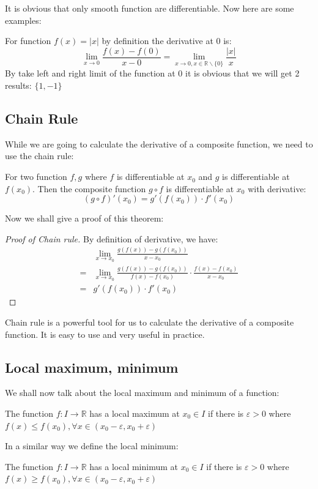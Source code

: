 \documentclass{article}
\newcommand{\R}{\mathbb{R}}
\begin{document}
It is obvious that only smooth function are differentiable. Now here are some examples:
\begin{example}
	For function $f(x)=|x|$ by definition the derivative at 0 is:
	\begin{equation*}
		\lim_{x\to 0}\frac{f(x)-f(0)}{x-0}=\lim_{x\to 0,x\in \R \backslash \{0\}} \frac{|x|}{x}
	\end{equation*}
By take left and right limit of the function at 0 it is obvious that we will get 2 results: $\{1,-1\}$
\end{example}

\subsection{Chain Rule}
While we are going to calculate the derivative of a composite function, we need to use the chain rule:
\begin{theorem}
  For two function $f,g$ where $f$ is differentiable at $x_0$ and $g$ is differentiable at $f(x_0)$. Then the composite function $g\circ f$ is differentiable at $x_0$ with derivative:
  \begin{equation*}
    (g\circ f)'(x_0)=g'(f(x_0))\cdot f'(x_0)
  \end{equation*}
\end{theorem}
Now we shall give a proof of this theorem:
\begin{proof}[Proof of Chain rule]
By definition of derivative, we have:
\begin{equation*}
  \begin{aligned}
    &\lim_{x\to x_0} \frac{g(f(x))-g(f(x_0))}{x-x_0}\\
    =&\lim_{x\to x_0} \frac{g(f(x))-g(f(x_0))}{f(x)-f(x_0)}\cdot \frac{f(x)-f(x_0)}{x-x_0}\\
    =&g'(f(x_0))\cdot f'(x_0)
  \end{aligned}
\end{equation*}
\end{proof}

Chain rule is a powerful tool for us to calculate the derivative of a composite function. It is easy to use and very useful in practice.


\subsection{Local maximum, minimum}
We shall now talk about the local maximum and minimum of a function:
\begin{definition}
The function $f:I\to \R$ has a local maximum at $x_0\in I$ if there is $\varepsilon>0$ where $f(x)\leq f(x_0),\forall x\in (x_0-\varepsilon,x_0+\varepsilon)$
\end{definition}
In a similar way we define the local minimum:
\begin{definition}
The function $f:I\to \R$ has a local minimum at $x_0\in I$ if there is $\varepsilon>0$ where $f(x)\geq f(x_0),\forall x\in (x_0-\varepsilon,x_0+\varepsilon)$
\end{definition}
\end{document}
